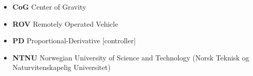 
\begin{itemize}
    \item \textbf{CoG} Center of Gravity
    \item \textbf{ROV} Remotely Operated Vehicle
    \item \textbf{PD} Proportional-Derivative [controller]
    \item \textbf{NTNU} Norwegian University of Science and Technology (Norsk Teknisk og Naturvitenskapelig Universitet)
    
\end{itemize}